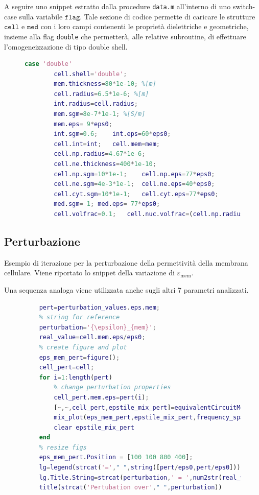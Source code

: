 A seguire uno snippet estratto dalla procedure \texttt{data.m} all'interno di uno switch-case sulla variabile $\mathtt{flag}$. Tale sezione di codice permette di caricare le strutture $\mathtt{cell}$ e $\mathtt{med}$ con i loro campi contenenti le proprietà dielettriche e geometriche, insieme alla flag \texttt{double} che permetterà, alle relative subroutine, di effettuare l'omogeneizzazione di tipo double shell.

\begin{figure}[h!]
	\begin{lstlisting}[language=matlab]
	case 'double'
		cell.shell='double';
		mem.thickness=80*1e-10; %[m]
		cell.radius=6.5*1e-6; %[m]
		int.radius=cell.radius;
		mem.sgm=8e-7*1e-1; %[S/m]
		mem.eps= 9*eps0; 
		int.sgm=0.6; 	int.eps=60*eps0;
		cell.int=int;	cell.mem=mem;
		cell.np.radius=4.67*1e-6;
		cell.ne.thickness=400*1e-10;
		cell.np.sgm=10*1e-1; 	cell.np.eps=77*eps0;
		cell.ne.sgm=4e-3*1e-1;	cell.ne.eps=40*eps0;
		cell.cyt.sgm=10*1e-1;	cell.cyt.eps=77*eps0;
		med.sgm= 1;	med.eps= 77*eps0;
		cell.volfrac=0.1; 	cell.nuc.volfrac=(cell.np.radius/cell.radius)^3;
	\end{lstlisting}
\end{figure}

\subsection*{Perturbazione}

Esempio di iterazione per la perturbazione della permettività della membrana cellulare. Viene riportato lo snippet della variazione di $\varepsilon_{\operatorname{m e m}}$. 

Una sequenza analoga viene utilizzata anche sugli altri 7 parametri analizzati.

\begin{figure}[h!]
	\begin{lstlisting}[language=matlab]
	% load pertubation values 
	pert=perturbation_values.eps.mem;
	% string for reference
	perturbation='{\epsilon}_{mem}'; 
	real_value=cell.mem.eps/eps0;
	% create figure and plot
	eps_mem_pert=figure();
	cell_pert=cell;
	for i=1:length(pert)
		% change perturbation properties
		cell_pert.mem.eps=pert(i);
		[~,~,cell_pert,epstile_mix_pert]=equivalentCircuitModel(med,cell_pert,frequency_span);
		mix_plot(eps_mem_pert,epstile_mix_pert,frequency_span,omega,{colorType1{i},colorType2{i}})
		clear epstile_mix_pert
	end
	% resize figs
	eps_mem_pert.Position = [100 100 800 400];
	lg=legend(strcat('='," ",string([pert/eps0,pert/eps0])),'Location','eastoutside');
	lg.Title.String=strcat(perturbation,' = ',num2str(real_value),' [S/m]');
	title(strcat('Pertubation over'," ",perturbation))
	\end{lstlisting}
\end{figure}